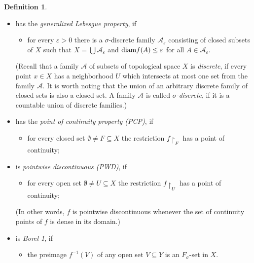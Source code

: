 \documentclass[a4paper]{amsart}
\theoremstyle{plain}
\theoremstyle{definition}
\newtheorem{definition}[theorem]{Definition}
\theoremstyle{remark}
\numberwithin{equation}{section}
\begin{document}
\begin{definition}
\begin{itemize}
			\item has the \emph{generalized Lebesgue property}, if
			\begin{itemize}
				\item[{\rm (GLP)}] for every $\varepsilon >0$ there is a $\sigma$-discrete family $\mathcal A_\varepsilon$ consisting of closed subsets of $X$ such that $X=\bigcup \mathcal A_\varepsilon$ and ${\rm diam}f(A)\le\varepsilon$ for all $A\in\mathcal A_\varepsilon$.
			\end{itemize}
			(Recall that a family $\mathcal A$ of subsets of topological space $X$ is {\it discrete}, if every point $x\in X$ has a neighborhood $U$ which intersects at most one set from the family $\mathcal A$. It is worth noting that the union of an arbitrary discrete family of closed sets is also a closed set.
			A family $\mathcal A$ is called {\it $\sigma$-discrete}, if it is a countable union of discrete families.)

			\item has the {\it point of continuity property (PCP)}, if 
			\begin{itemize}
				\item [{\rm (PCP)}]	for every  closed set $\emptyset\ne F\subseteq X$ the restriction $f\restriction_F$ has a point of continuity;
			\end{itemize}

            \item is {\it pointwise discontinuous (PWD)}, if 
			\begin{itemize}
				\item [{\rm (PWD)}]	for every open set $\emptyset\ne U\subseteq X$ the restriction $f\restriction_U$ has a point of continuity;
			\end{itemize}
            (In other words, $f$ is pointwise discontinuous whenever
            the set of continuity points of $f$ is dense in its domain.)
			
			\item is \emph{Borel 1}, if 
			\begin{itemize}
				\item[{\rm (Borel 1)}] the preimage $f^{-1}(V)$ of any open set $V\subseteq Y$ is an $F_\sigma$-set in $X$.
			\end{itemize}							
		\end{itemize}
	\end{definition}
	
\end{document}
